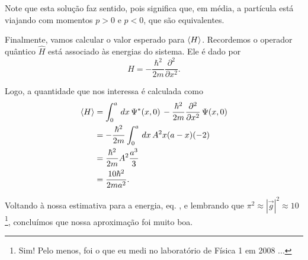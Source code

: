 \documentclass[red]{mecanica_quantica}
\begin{document}
	 Note que esta solução faz sentido, pois significa que, em média, a partícula está viajando com momentos $p > 0$ e $p < 0$, que são equivalentes.
	 
	 Finalmente, vamos calcular o valor esperado para $\langle H\rangle$. Recordemos o operador quântico $\hat{H}$ está associado às energias do sistema. Ele é dado por
	 \begin{equation}
	 	\label{eq:operadorH}
	 	H = -\frac{\hbar^2}{2m} \frac{\partial^2}{\partial x^2}.
	 \end{equation}
	 
	 Logo, a quantidade que nos interessa é calculada como
	 \begin{align}
	 \label{eq:E0esp}
	 	\langle H\rangle & = \int_{0}^{a} \, dx \,  \Psi^*(x,0) \, -\frac{\hbar^2}{2m} \frac{\partial^2}{\partial x^2} \,  \Psi(x,0) \nonumber \\
	 	& =-\frac{\hbar^2}{2m} \int_{0}^{a} \, dx \, A^2 x(a-x)(-2) \nonumber \\
	 	& = \frac{\hbar^2}{2m} A^2 \frac{a^3}{3} \nonumber \\
	 	& = \frac{10 \hbar^2}{2m a^2}.
	 \end{align}	 
	 
	 Voltando à nossa estimativa para a energia, eq. , e lembrando que $\pi^2 \approx |\vec{g}|^2 \approx 10$ \footnote{Sim! Pelo menos, foi o que eu medi no laboratório de Física 1 em 2008 ...}, concluímos que nossa aproximação foi muito boa.
	 
\end{document}
